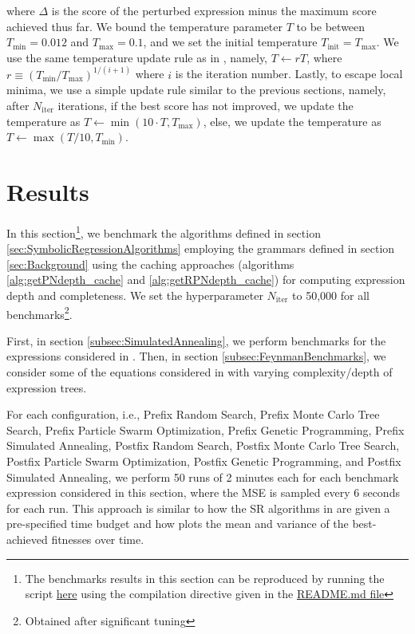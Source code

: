 \documentclass[12pt]{iopart}
\begin{document}
where $\Delta$ is the score of the perturbed expression minus the maximum score achieved thus far. We bound the temperature parameter $T$ to be between $T_{\mathrm{min}} = 0.012$ and $T_{\mathrm{max}} = 0.1$, and we set the initial temperature $T_{\mathrm{init}} = T_{\mathrm{max}}$. We use the same temperature update rule as in \cite{10.1145/3449639.3459345}, namely, $T \gets rT$, where $r \equiv \left(T_{\mathrm{min}}/T_{\mathrm{max}}\right)^{1/(i+1)}$ where $i$ is the iteration number. Lastly, to escape local minima, we use a simple update rule similar to the previous sections, namely, after $N_{\mathrm{iter}}$ iterations, if the best score has not improved, we update the temperature as $T \gets \min{\left(10\cdot T, T_{\mathrm{max}}\right)}$, else, we update the temperature as $T \gets \max{\left(T/10, T_{\mathrm{min}}\right)}$.

\section{Results}\label{sec:Results}
In this section\footnote{The benchmarks results in this section can be reproduced by running the script \href{https://github.com/edfink234/Alpha-Zero-Symbolic-Regression/blob/dce0e2ddd1a172598dcae31b738900ce9e6403e9/PrefixPostfixSR.cpp}{here} using the compilation directive given in the \href{https://github.com/edfink234/Alpha-Zero-Symbolic-Regression/blob/dce0e2ddd1a172598dcae31b738900ce9e6403e9/README.md}{README.md file}}, we benchmark the algorithms defined in section \ref{sec:SymbolicRegressionAlgorithms} employing the grammars defined in section \ref{sec:Background} using the caching approaches (algorithms \ref{alg:getPNdepth_cache} and \ref{alg:getRPNdepth_cache}) for computing expression depth and completeness. We set the hyperparameter $N_{\mathrm{iter}}$ to 50,000 for all benchmarks\footnote{Obtained after significant tuning}.
\par First, in section \ref{subsec:SimulatedAnnealing}, we perform benchmarks for the expressions considered in \cite{hemberg2008pre}. Then, in section \ref{subsec:FeynmanBenchmarks}, we consider some of the equations considered in \cite{udrescu2020ai} with varying complexity/depth of expression trees.
\par For each configuration, i.e., Prefix Random Search, Prefix Monte Carlo Tree Search, Prefix Particle Swarm Optimization, Prefix Genetic Programming,  Prefix Simulated Annealing, Postfix Random Search, Postfix Monte Carlo Tree Search, Postfix Particle Swarm Optimization, Postfix Genetic Programming, and Postfix Simulated Annealing, we perform 50 runs of 2 minutes each for each benchmark expression considered in this section, where the MSE is sampled every 6 seconds for each run.  
This approach is similar to how the SR algorithms in \cite{defranca2023interpretable} are given a pre-specified time budget and how \cite{manti2023discovering} plots the mean and variance of the best-achieved fitnesses over time. 
\end{document}
